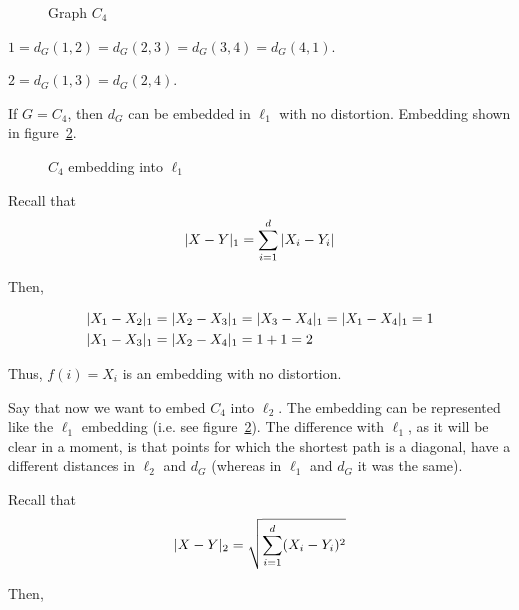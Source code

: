     \begin{figure}[h]
        \centering
        
        \caption{Graph $C_4$}
        \label{fig:c4}
    \end{figure}

    $1 = d_G(1,2) = d_G(2,3) = d_G(3,4) = d_G(4,1)$.

    $2 = d_G(1,3) = d_G(2,4)$.

    If $G = C_4$, then $d_G$ can be embedded in $\ell_1$ with no distortion.
    Embedding shown in figure~\ref{fig:c4_l1_embedding}.

    \begin{figure}[h]
        \centering
        
        \caption{$C_4$ embedding into $\ell_1$}
        \label{fig:c4_l1_embedding}
    \end{figure}

    Recall that
    \[ \vert X-Y \vert_1 = \sum_{i=1}^{d} \vert X_i - Y_i \vert \]

    Then,

    \begin{equation*}
        \begin{split}
            &\vert X_1 - X_2 \vert_1 = \vert X_2 - X_3 \vert_1 = \vert X_3 - X_4 \vert_1 = \vert X_1 - X_4 \vert_1 = 1\\
            &\vert X_1 - X_3 \vert_1 = \vert X_2 - X_4 \vert_1 = 1+1 = 2
        \end{split}
    \end{equation*}

    Thus, $f(i) = X_i$ is an embedding with no distortion.

    Say that now we want to embed $C_4$ into $\ell_2$.
    The embedding can be represented like the $\ell_1$ embedding (i.e. see figure~\ref{fig:c4_l1_embedding}).
    The difference with $\ell_1$, as it will be clear in a moment, is that points for which the shortest path is a diagonal, have a different distances in $\ell_2$ and $d_G$ (whereas in $\ell_1$ and $d_G$ it was the same).

    Recall that
    \[ \vert X-Y \vert_2 = \sqrt{\sum_{i=1}^{d} (X_i - Y_i)^2} \]

    Then,


